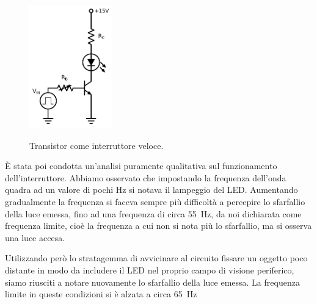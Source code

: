 \begin{figure}
	\caption{Transistor come interruttore veloce.}
	\includegraphics[width=36mm]{cc2.pdf}
	\label{fig:cc2}
\end{figure}

È stata poi condotta un'analisi puramente qualitativa sul funzionamento dell'interruttore. Abbiamo osservato che impostando la frequenza dell'onda quadra ad un valore di pochi \si{\hertz} si notava il lampeggio del LED. Aumentando gradualmente la frequenza si faceva sempre più difficoltà a percepire lo sfarfallio della luce emessa, fino ad una frequenza di circa \SI{55}{\hertz}, da noi dichiarata come frequenza limite, cioè la frequenza a cui non si nota più lo sfarfallio, ma si osserva una luce accesa.

Utilizzando però lo stratagemma di avvicinare al circuito fissare un oggetto poco distante in modo da includere il LED nel proprio campo di visione periferico, siamo riusciti a notare nuovamente lo sfarfallio della luce emessa. La frequenza limite in queste condizioni si è alzata a circa \SI{65}{\hertz}
